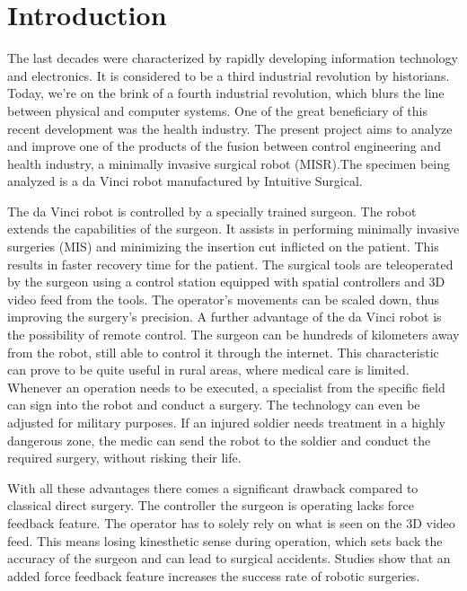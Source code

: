 
%
	
\chapter{Introduction}

The last decades were characterized by rapidly developing information technology and electronics. It is considered to be a third industrial revolution by historians. Today, we're on the brink of a fourth industrial revolution, which blurs the line between physical and computer systems. One of the great beneficiary of this recent development was the health industry. The present project aims to analyze and improve one of the products of the fusion between control engineering and health industry, a minimally invasive surgical robot (MISR).The specimen being analyzed is a da Vinci robot manufactured by Intuitive Surgical.

The da Vinci robot is controlled by a specially trained surgeon. The robot extends the capabilities of the surgeon. It assists in performing minimally invasive surgeries (MIS) and minimizing the insertion cut inflicted on the patient.
This results in faster recovery time for the patient\cite{rec_time}. The surgical tools are teleoperated by the surgeon using a control station equipped with spatial controllers and 3D video feed from the tools. The operator's movements can be scaled down, thus improving the surgery's precision. A further advantage of the da Vinci robot is the possibility of remote control. The surgeon can be hundreds of kilometers away from the robot, still able to control it through the internet. This characteristic can prove to be quite useful in rural areas, where medical care is limited. Whenever an operation needs to be executed, a specialist from the specific field can sign into the robot and conduct a surgery. The technology can even be adjusted for military purposes. If an injured soldier needs treatment in a highly dangerous zone, the medic can send the robot to the soldier and conduct the required surgery, without risking their life.

With all these advantages there comes a significant drawback compared to classical direct surgery. The controller the surgeon is operating lacks force feedback feature\cite{lack_fb}. The operator has to solely rely on what is seen on the 3D video feed. This means losing kinesthetic sense during operation, which sets back the accuracy of the surgeon and can lead to surgical accidents. Studies show that an added force feedback feature increases the success rate of robotic surgeries\cite{lack_fb}.

